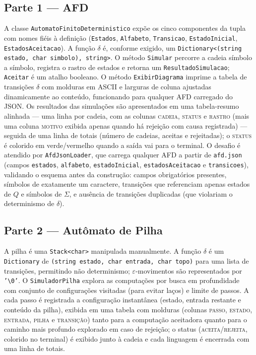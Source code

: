\documentclass[12pt,a4paper]{article}
\begin{document}
\subsection{Parte 1 --- AFD}
A classe \texttt{AutomatoFinitoDeterministico} expõe os cinco componentes da tupla
com nomes fiéis à definição (\texttt{Estados}, \texttt{Alfabeto},
\texttt{Transicao}, \texttt{EstadoInicial}, \texttt{EstadosAceitacao}). A função
$\delta$ é, conforme exigido, um
\texttt{Dictionary<(string estado, char simbolo), string>}. O método
\texttt{Simular} percorre a cadeia símbolo a símbolo, registra o rastro de estados
e retorna um \texttt{ResultadoSimulacao}; \texttt{Aceitar} é um atalho booleano.
O método \texttt{ExibirDiagrama} imprime a tabela de transições $\delta$ com
molduras em ASCII e larguras de coluna ajustadas dinamicamente ao conteúdo,
funcionando para qualquer AFD carregado do JSON. Os resultados das simulações são
apresentados em uma tabela-resumo alinhada --- uma linha por cadeia, com as colunas
\textsc{cadeia}, \textsc{status} e \textsc{rastro} (mais uma coluna \textsc{motivo}
exibida apenas quando há rejeição com causa registrada) --- seguida de uma linha de
totais (número de cadeias, aceitas e rejeitadas); o \textsc{status} é colorido em
verde/vermelho quando a saída vai para o terminal. O desafio é
atendido por \texttt{AfdJsonLoader}, que carrega qualquer AFD a partir de
\texttt{afd.json} (campos \texttt{estados}, \texttt{alfabeto},
\texttt{estadoInicial}, \texttt{estadosAceitacao} e \texttt{transicoes}),
validando o esquema antes da construção: campos obrigatórios presentes,
símbolos de exatamente um caractere, transições que referenciam apenas estados
de $Q$ e símbolos de $\Sigma$, e ausência de transições duplicadas (que
violariam o determinismo de $\delta$).

\subsection{Parte 2 --- Autômato de Pilha}
A pilha é uma \texttt{Stack<char>} manipulada manualmente. A função $\delta$ é um
\texttt{Dictionary} de \texttt{(string estado, char entrada, char topo)} para uma
lista de transições, permitindo não determinismo; $\varepsilon$-movimentos são
representados por \texttt{'\textbackslash 0'}. O \texttt{SimuladorPilha} explora as
computações por busca em profundidade com conjunto de configurações visitadas
(para evitar laços) e limite de passos. A cada passo é registrada a configuração
instantânea (estado, entrada restante e conteúdo da pilha), exibida em uma
tabela com molduras (colunas \textsc{passo}, \textsc{estado}, \textsc{entrada},
\textsc{pilha} e \textsc{transição}) tanto para a computação aceitadora quanto
para o caminho mais profundo explorado em caso de rejeição; o status
(\textsc{aceita}/\textsc{rejeita}, colorido no terminal) é exibido junto à cadeia
e cada linguagem é encerrada com uma linha de totais.
\end{document}
